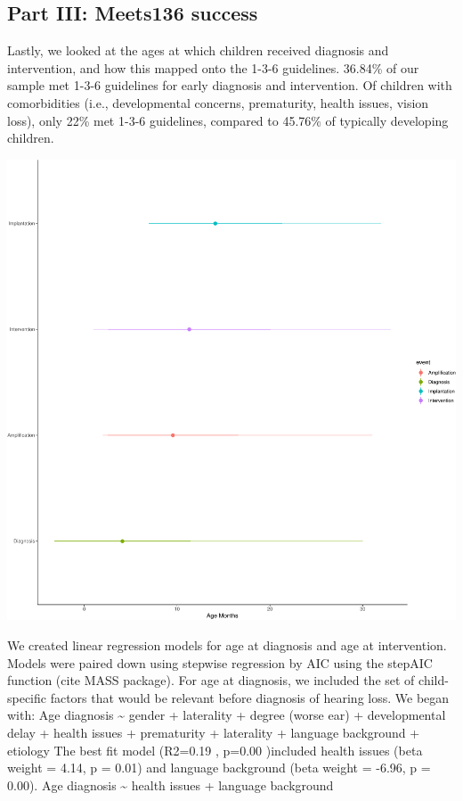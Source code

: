 \documentclass[english,man]{apa6}
\begin{document}
\hypertarget{part-iii-meets136-success}{%
\subsection{Part III: Meets136 success}\label{part-iii-meets136-success}}

Lastly, we looked at the ages at which children received diagnosis and intervention, and how this mapped onto the 1-3-6 guidelines. 36.84\% of our sample met 1-3-6 guidelines for early diagnosis and intervention. Of children with comorbidities (i.e., developmental concerns, prematurity, health issues, vision loss), only 22\% met 1-3-6 guidelines, compared to 45.76\% of typically developing children.

\includegraphics{ELSSP_paper_files/figure-latex/meets136-timeline-1.pdf}

We created linear regression models for age at diagnosis and age at intervention. Models were paired down using stepwise regression by AIC using the stepAIC function (cite MASS package). For age at diagnosis, we included the set of child-specific factors that would be relevant before diagnosis of hearing loss. We began with:
Age diagnosis \textasciitilde{} gender + laterality + degree (worse ear) + developmental delay + health issues + prematurity + laterality + language background + etiology
The best fit model (R2=0.19 , p=0.00 )included health issues (beta weight = 4.14, p = 0.01) and language background (beta weight = -6.96, p = 0.00).
Age diagnosis \textasciitilde{} health issues + language background
\end{document}
